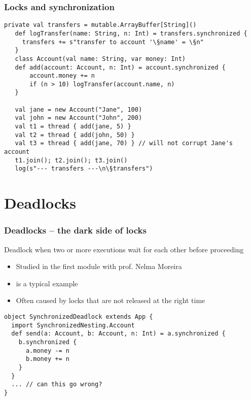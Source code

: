 \documentclass[aspectratio=169]{beamer}
\begin{document}
\begin{frame}[fragile]\frametitle{Locks and synchronization}
\begin{lstlisting}[emph={assert,sleep,log,thread,join,synchronized}]
   private val transfers = mutable.ArrayBuffer[String]()
   def logTransfer(name: String, n: Int) = transfers.synchronized {
     transfers += s"transfer to account '\§name' = \§n"
   }
   class Account(val name: String, var money: Int)
   def add(account: Account, n: Int) = account.synchronized {
       account.money += n
       if (n > 10) logTransfer(account.name, n)
   }

   val jane = new Account("Jane", 100)
   val john = new Account("John", 200)
   val t1 = thread { add(jane, 5) }
   val t2 = thread { add(john, 50) }
   val t3 = thread { add(jane, 70) } // will not corrupt Jane's account
   t1.join(); t2.join(); t3.join()
   log(s"--- transfers ---\n\§transfers")
\end{lstlisting}
\end{frame}


\section{Deadlocks}

\begin{frame}[fragile]\frametitle{Deadlocks -- the dark side of locks}

\begin{alertblock}{Deadlock}
  when two or more executions wait for each other before proceeding
\end{alertblock}

\begin{itemize}
  \item Studied in the first module with prof. Nelma Moreira
  \item {} is a typical example
  \item Often caused by locks that are not released at the right time
\end{itemize}

\begin{lstlisting}[emph={assert,sleep,log,thread,join,synchronized}]
object SynchronizedDeadlock extends App {
  import SynchronizedNesting.Account
  def send(a: Account, b: Account, n: Int) = a.synchronized {
    b.synchronized {
      a.money -= n
      b.money += n
    }
  }
  ... // can this go wrong?
}
\end{lstlisting}
\end{frame}
\end{document}
